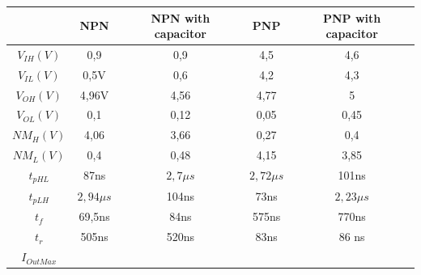 \documentclass[a4paper,11pt]{report}
\begin{document}
\begin{tabular}{|c|c|c|c|c|}
\hline
 & NPN & NPN with capacitor &PNP& PNP with capacitor\\
\hline
\hline
$V_{IH} (V)$ & 0,9 & 0,9 & 4,5 & 4,6  \\
\hline
$V_{IL} (V)$ & 0,5V & 0,6 & 4,2 & 4,3 \\
\hline
$V_{OH} (V)$ & 4,96V & 4,56 & 4,77 & 5 \\
\hline
$V_{OL} (V)$ & 0,1 & 0,12 & 0,05 & 0,45\\ 
\hline
$NM_{H} (V) $ & 4,06 & 3,66 & 0,27 & 0,4\\ %
\hline
$NM_{L} (V) $ & 0,4 & 0,48 & 4,15 & 3,85 \\  %
\hline
$t_{pHL}$ & 87ns & $2,7\mu s $ &  $2,72\mu s$ & 101ns \\
\hline
$t_{pLH}$ & $2,94\mu s$ &  104ns &  73ns &  $2,23\mu s$\\
\hline
$t_{f}$ & 69,5ns & 84ns & 575ns & 770ns\\
\hline
$t_{r}$ & 505ns & 520ns & 83ns & 86 ns\\
\hline
$ I_{Out{Max}}$ &   &   &   &   \\ %
\hline
\end{tabular}
\end{document}
